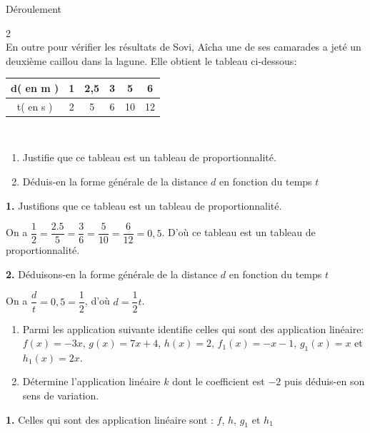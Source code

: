  \newpage
 \begin{center}
 	Déroulement
 \end{center}
 \begin{multicols*}{2}
 	\\
 	\setcounter{q}{0}
 	En outre pour vérifier les résultats de Sovi, Aîcha une de ses camarades a jeté un deuxième caillou dans la lagune. Elle obtient le tableau ci-dessous:
 	
 	\begin{tabular}{|c|c|c|c|c|c|}
 		\hline 
 		d( en m )	& 1 &2,5  & 3 & 5 & 6 \\ 
 		\hline 
 		t( en s )	&  2&  5&6  &10  &12  \\ 
 		\hline 
 	\end{tabular} \\
 	
 	\begin{enumerate}
 		\item Justifie que ce tableau est un tableau de proportionnalité.
 		\item Déduis-en la forme générale de la distance $d$ en fonction du temps $t$
 	\end{enumerate}
 	\dure 
 	\resul
 	\textbf{1.} Justifions que ce tableau est un tableau de proportionnalité.
 	
 	On a $\dfrac{1}{2}=\dfrac{2.5}{5}=\dfrac{3}{6}=\dfrac{5}{10}=\dfrac{6}{12}=0,5$. D'où ce tableau est un tableau de proportionnalité.
 	
 	\textbf{2.} Déduisons-en la forme générale de la distance $d$ en fonction du temps $t$
 	
 	On a $\dfrac{d}{t}=0,5=\dfrac{1}{2}$, d'où $d=\dfrac{1}{2}t$.
 	
 	\begin{enumerate}
 		\item  Parmi les application suivante identifie celles qui sont des application linéaire: $ f(x)=-3x $, $ g(x)=7x+4 $, $ h(x)=2$, $ f_1(x)=-x-1 $, $ g_1(x)=x $ et $ h_1(x)=2x$.
 		\item  Détermine l'application linéaire $k$ dont le coefficient est $ -2 $ puis déduis-en son sens de variation.
 	\end{enumerate}
 	\dure 
 	\resul
 	\textbf{1.} Celles qui sont des application linéaire sont : $f$, $h$, $g_{1}$ et $h_{1}$
 	

\end{multicols*}
